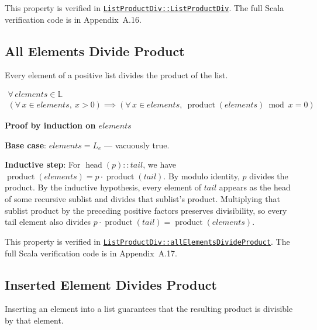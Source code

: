 {\raggedright
This property is verified in
\href{https://github.com/thiagomata/prime-numbers/blob/list-article-v1.0.0/src/main/scala/v1/chapter3/list/properties/ListProductDiv.scala}{\texttt{ListProductDiv::\allowbreak ListProductDiv}}.
The full Scala verification code is in Appendix~A.16.
\par}

\subsection{All Elements Divide Product}

Every element of a positive list divides the product of the list.

\begin{gather*}
\forall\, elements \in \mathbb{L} \\
(\forall\, x \in elements,\ x > 0) \implies (\forall\, x \in elements,\ \operatorname{product}(elements) \bmod x = 0)
\end{gather*}

\textbf{Proof by induction on $elements$}\par\nopagebreak

\textbf{Base case}: $elements = L_e$ --- vacuously true.\par\nopagebreak

\textbf{Inductive step}: For $\operatorname{head}(p) :: tail$, we have
$\operatorname{product}(elements) = p \cdot \operatorname{product}(tail)$.
By modulo identity, $p$ divides the product. By the inductive hypothesis,
every element of $tail$ appears as the head of some recursive sublist and
divides that sublist's product. Multiplying that sublist product by the
preceding positive factors preserves divisibility, so every tail element
also divides $p \cdot \operatorname{product}(tail) = \operatorname{product}(elements)$.

{\raggedright
This property is verified in
\href{https://github.com/thiagomata/prime-numbers/blob/list-article-v1.0.0/src/main/scala/v1/chapter3/list/properties/ListProductDiv.scala}{\texttt{ListProductDiv::\allowbreak allElementsDivideProduct}}.
The full Scala verification code is in Appendix~A.17.
\par}

\subsection{Inserted Element Divides Product}

Inserting an element into a list guarantees that the resulting product is
divisible by that element.


